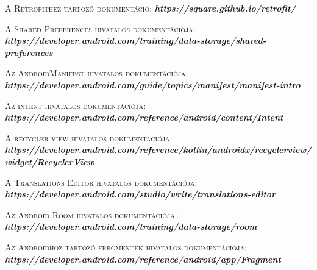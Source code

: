 \documentclass[
]{thesis-ekf}
\theoremstyle{definition}
\theoremstyle{remark}
\begin{document}
\begin{thebibliography}{2}
		\textsc{A Retrofithez tartozó dokumentáció:}
		\newline
		\emph{\bf{https://square.github.io/retrofit/}}
		
		\textsc{A Shared Preferences hivatalos dokumentációja:}
		\newline
		\emph{\bf{https://developer.android.com/training/data-storage/shared-preferences}}
		
		\textsc{Az AndroidManifest hivatalos dokumentációja:}
		\newline
		\emph{\bf{https://developer.android.com/guide/topics/manifest/manifest-intro}}
		
		\textsc{Az intent hivatalos dokumentációja:}
		\newline
		\emph{\bf{https://developer.android.com/reference/android/content/Intent}}
		
		\textsc{A recycler view hivatalos dokumentációja:}
		\newline
		\emph{\bf{https://developer.android.com/reference/kotlin/androidx/recyclerview/widget/RecyclerView}}
		
		\textsc{A Translations Editor hivatalos dokumentációja:}
		\newline
		\emph{\bf{https://developer.android.com/studio/write/translations-editor}}
		
		\textsc{Az Android Room hivatalos dokumentációja:}
		\newline
		\emph{\bf{https://developer.android.com/training/data-storage/room}}
		
		\textsc{Az Androidhoz tartózó fregmentek hivatalos dokumentációja:}
		\newline
		\emph{\bf{https://developer.android.com/reference/android/app/Fragment}}
		
	\end{thebibliography}
	
\end{document}
